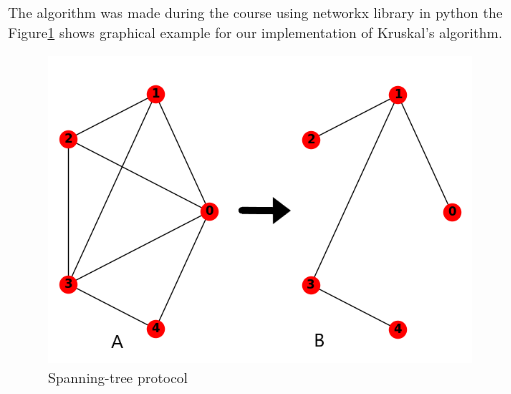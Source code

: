 The algorithm was made during the course using networkx library in python the Figure\ref{fig:STP} shows graphical example for our implementation of Kruskal's algorithm.

\begin{figure}[H]\label{}
	\centering
	\includegraphics[scale=0.5]{realTimeEthernet/Image/STP.png}
	\caption{Spanning-tree protocol}
	\label{fig:STP}
\end{figure}


